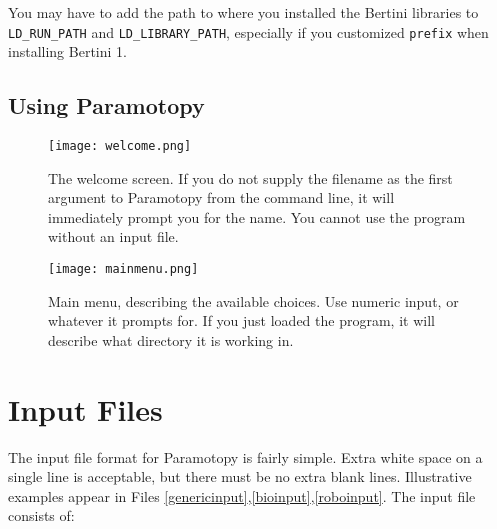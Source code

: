 You may have to add the path to where you installed the Bertini libraries to {\tt LD\_RUN\_PATH} and {\tt LD\_LIBRARY\_PATH}, especially if you customized {\tt prefix} when installing Bertini 1.


\clearpage
\subsection{Using Paramotopy}
\label{sec:running}

\begin{figure}[h]
\begin{center}
\texttt{[image: welcome.png]}
\caption[Welcome Screen]{The welcome screen.  If you do not supply the filename as the first argument to Paramotopy from the command line, it will immediately prompt you for the name.  You cannot use the program without an input file.}
\label{screen:welcome}
\end{center}
\end{figure}



\begin{figure}[h]
\begin{center}
\texttt{[image: mainmenu.png]}
\caption[Main Menu]{Main menu, describing the available choices.  Use numeric input, or whatever it prompts for. If you just loaded the program, it will describe what directory it is working in.}
\label{screen:mainmenu}
\end{center}
\end{figure}



\clearpage
\section{Input Files}
\label{sec:input}

The input file format for Paramotopy is fairly simple.  Extra white space on a single line is acceptable, but there must be no extra blank lines.  Illustrative examples appear in Files \ref{genericinput},\ref{bioinput},\ref{roboinput}. The input file consists of:

